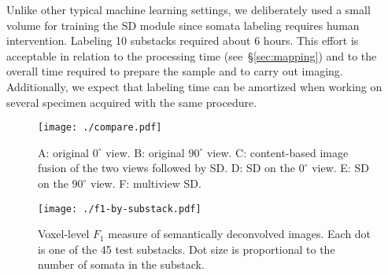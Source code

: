 \documentclass[smallextended]{svjour3}       %
\begin{document}
Unlike other typical machine learning settings, we deliberately used a
small volume for training the SD module since somata labeling requires
human intervention. Labeling 10 substacks required about 6 hours.
This effort is acceptable in relation to the processing time (see~\S\ref{sec:mapping}) and to the overall time required to prepare
the sample and to carry out imaging. Additionally, we expect that
labeling time can be amortized when working on several specimen
acquired with the same procedure.


\begin{figure*}
  \centering
  \texttt{[image: ./compare.pdf]}
  \caption{A: original $0^\circ$ view. B: original $90^\circ$ view. C:
    content-based image fusion of the two views followed by SD. D: SD on the $0^\circ$ view. E:
    SD on the $90^\circ$ view. F: multiview SD.}
  \label{fig:compare}
\end{figure*}

\begin{figure*}
  \centering
  \texttt{[image: ./f1-by-substack.pdf]}
  \caption{Voxel-level $F_1$ measure of semantically deconvolved images.
    Each dot is one of the 45 test substacks. Dot size is proportional to the
    number of somata in the substack.}
  \label{fig:f1-by-substack}
\end{figure*}
\end{document}
